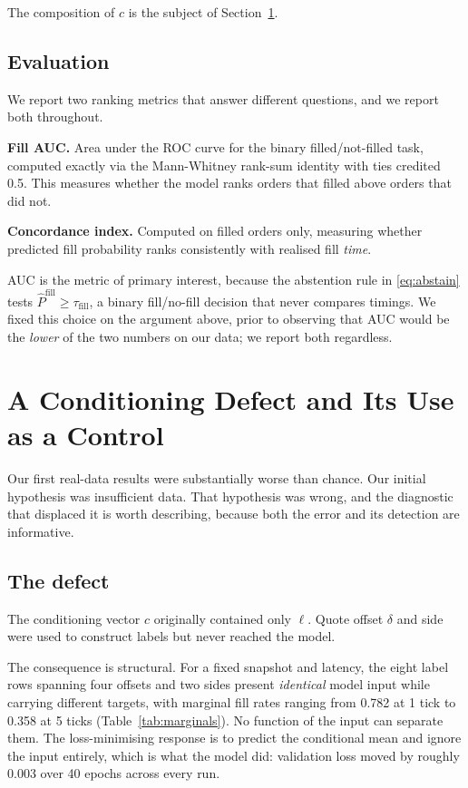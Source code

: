 \documentclass[11pt]{article}
\begin{document}
The composition of $c$ is the subject of Section~\ref{sec:defect}.

\subsection{Evaluation}
\label{sec:metrics}

We report two ranking metrics that answer different questions, and we report
both throughout.

\textbf{Fill AUC.} Area under the ROC curve for the binary filled/not-filled
task, computed exactly via the Mann-Whitney rank-sum identity with ties credited
0.5. This measures whether the model ranks orders that filled above orders that
did not.

\textbf{Concordance index.} Computed on filled orders only, measuring whether
predicted fill probability ranks consistently with realised fill \emph{time}.

AUC is the metric of primary interest, because the abstention rule in
\eqref{eq:abstain} tests $\widehat{P}^{\text{fill}} \geq \tau_{\text{fill}}$,
a binary fill/no-fill decision that never compares timings. We fixed this
choice on the argument above, prior to observing that AUC would be the
\emph{lower} of the two numbers on our data; we report both regardless.

\section{A Conditioning Defect and Its Use as a Control}
\label{sec:defect}

Our first real-data results were substantially worse than chance. Our initial hypothesis was insufficient data. That hypothesis was wrong, and
the diagnostic that displaced it is worth describing, because both the error and
its detection are informative.

\subsection{The defect}

The conditioning vector $c$ originally contained only $\ell$. Quote offset
$\delta$ and side were used to construct labels but never reached the model.

The consequence is structural. For a fixed snapshot and latency, the eight label
rows spanning four offsets and two sides present \emph{identical} model input
while carrying different targets, with marginal fill rates ranging from 0.782 at
1 tick to 0.358 at 5 ticks (Table~\ref{tab:marginals}). No function of the
input can separate them. The loss-minimising response is to predict the
conditional mean and ignore the input entirely, which is what the model did:
validation loss moved by roughly 0.003 over 40 epochs across every run.
\end{document}
